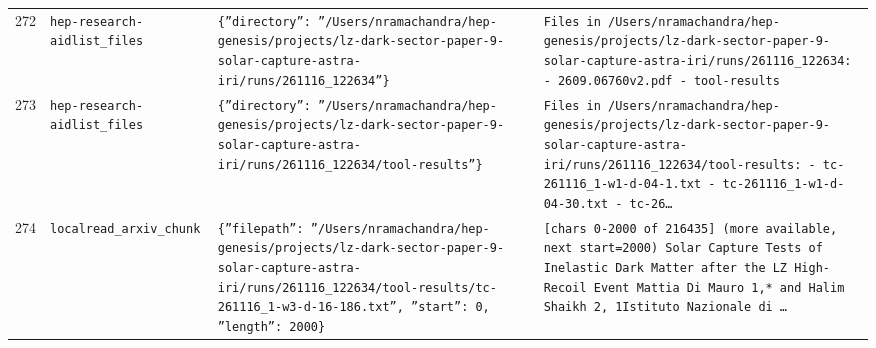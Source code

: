 \documentclass[11pt,a4paper]{article}
\begin{document}
\begin{longtable}{@{}p{}p{}p{}p{}@{}}
272 & \texttt{hep-research-aid}\newline\texttt{list\_\allowbreak{}files} & \texttt{\{''directory'':\allowbreak{} ''/\allowbreak{}Users/\allowbreak{}nramachandra/\allowbreak{}hep-genesis/\allowbreak{}projects/\allowbreak{}lz-dark-sector-paper-9-solar-capture-astra-iri/\allowbreak{}runs/\allowbreak{}261116\_\allowbreak{}122634''\}\allowbreak{}} & \texttt{Files in /\allowbreak{}Users/\allowbreak{}nramachandra/\allowbreak{}hep-genesis/\allowbreak{}projects/\allowbreak{}lz-dark-sector-paper-9-solar-capture-astra-iri/\allowbreak{}runs/\allowbreak{}261116\_\allowbreak{}122634:\allowbreak{}   - 2609.06760v2.pdf   - tool-results} \\
273 & \texttt{hep-research-aid}\newline\texttt{list\_\allowbreak{}files} & \texttt{\{''directory'':\allowbreak{} ''/\allowbreak{}Users/\allowbreak{}nramachandra/\allowbreak{}hep-genesis/\allowbreak{}projects/\allowbreak{}lz-dark-sector-paper-9-solar-capture-astra-iri/\allowbreak{}runs/\allowbreak{}261116\_\allowbreak{}122634/\allowbreak{}tool-results''\}\allowbreak{}} & \texttt{Files in /\allowbreak{}Users/\allowbreak{}nramachandra/\allowbreak{}hep-genesis/\allowbreak{}projects/\allowbreak{}lz-dark-sector-paper-9-solar-capture-astra-iri/\allowbreak{}runs/\allowbreak{}261116\_\allowbreak{}122634/\allowbreak{}tool-results:\allowbreak{}   - tc-261116\_\allowbreak{}1-w1-d-04-1.txt   - tc-261116\_\allowbreak{}1-w1-d-04-30.txt   - tc-26\ldots{}\allowbreak{}} \\
274 & \texttt{local}\newline\texttt{read\_\allowbreak{}arxiv\_\allowbreak{}chunk} & \texttt{\{''filepath'':\allowbreak{} ''/\allowbreak{}Users/\allowbreak{}nramachandra/\allowbreak{}hep-genesis/\allowbreak{}projects/\allowbreak{}lz-dark-sector-paper-9-solar-capture-astra-iri/\allowbreak{}runs/\allowbreak{}261116\_\allowbreak{}122634/\allowbreak{}tool-results/\allowbreak{}tc-261116\_\allowbreak{}1-w3-d-16-186.txt'',\allowbreak{} ''start'':\allowbreak{} 0,\allowbreak{} ''length'':\allowbreak{} 2000\}\allowbreak{}} & \texttt{[chars 0-2000 of 216435]\allowbreak{} (more available,\allowbreak{} next start=\allowbreak{}2000)\allowbreak{}  Solar Capture Tests of Inelastic Dark Matter after the LZ High-Recoil Event Mattia Di Mauro 1,\allowbreak{}* and Halim Shaikh 2,\allowbreak{}\dag{}\allowbreak{} 1Istituto Nazionale di \ldots{}\allowbreak{}} \\

\end{longtable}
\end{document}
